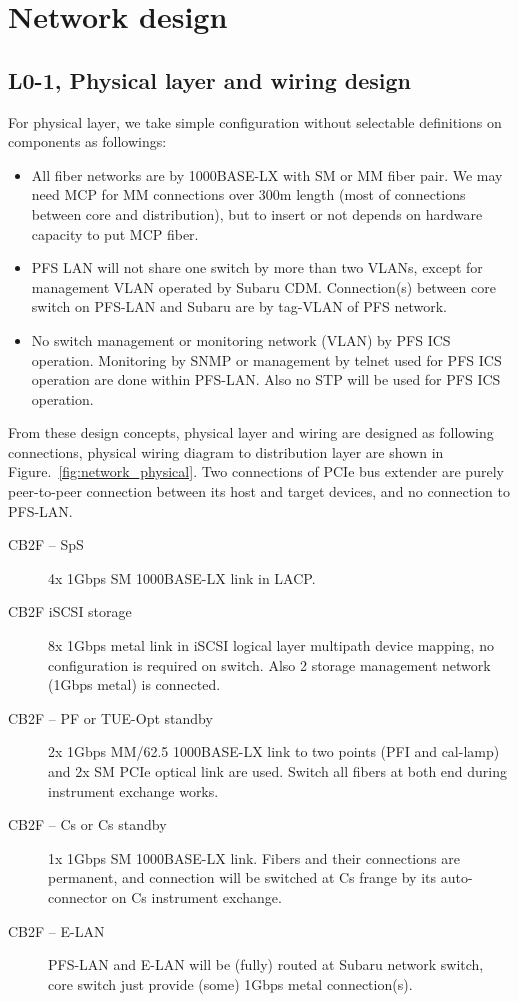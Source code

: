 \documentclass[a4paper,notitlepage]{article}
\begin{document}
\section{Network design}

\subsection{L0-1, Physical layer and wiring design}

For physical layer, we take simple configuration without selectable definitions 
on components as followings:

\begin{itemize}
  \item All fiber networks are by 1000BASE-LX with SM or MM fiber pair. We may 
    need MCP for MM connections over 300m length (most of connections between 
    core and distribution), but to insert or not depends on hardware capacity 
    to put MCP fiber.
  \item PFS LAN will not share one switch by more than two VLANs, except for 
    management VLAN operated by Subaru CDM. Connection(s) between core switch 
    on PFS-LAN and Subaru are by tag-VLAN of PFS network.
  \item No switch management or monitoring network (VLAN) by PFS ICS operation. 
    Monitoring by SNMP or management by telnet used for PFS ICS operation are 
    done within PFS-LAN. Also no STP will be used for PFS ICS operation.
\end{itemize}

From these design concepts, physical layer and wiring are designed as following 
connections, physical wiring diagram to distribution layer are shown in 
Figure.~\ref{fig:network_physical}. 
Two connections of PCIe bus extender are purely peer-to-peer connection between 
its host and target devices, and no connection to PFS-LAN. 

\begin{description}
  \item [CB2F -- SpS] 4x 1Gbps SM 1000BASE-LX link in LACP.
  \item [CB2F iSCSI storage] 8x 1Gbps metal link in iSCSI logical layer 
    multipath device mapping, no configuration is required on switch. 
    Also 2 storage management network (1Gbps metal) is connected.
  \item [CB2F -- PF or TUE-Opt standby] 2x 1Gbps MM/62.5 1000BASE-LX link 
    to two points (PFI and cal-lamp) and 2x SM PCIe optical link are used. 
    Switch all fibers at both end during instrument exchange works.
  \item [CB2F -- Cs or Cs standby] 1x 1Gbps SM 1000BASE-LX link. Fibers and 
    their connections are permanent, and connection will be switched at Cs 
    frange by its auto-connector on Cs instrument exchange.
  \item [CB2F -- E-LAN] PFS-LAN and E-LAN will be (fully) routed at Subaru 
    network switch, core switch just provide (some) 1Gbps metal connection(s).
\end{description}
\end{document}

